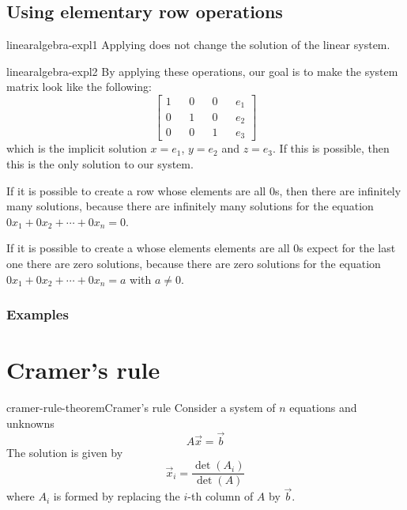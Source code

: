 \documentclass[preview]{standalone}
\begin{document}
\subsection{Using elementary row operations}

\begin{snippet}{linearalgebra-expl1}
    Applying 
    does not change the solution of the linear system.
\end{snippet}


\begin{snippet}{linearalgebra-expl2}
    By applying these operations, our goal is to make the system matrix
    look like the following:
    \[
        \begin{bmatrix} 
            1 && 0 && 0 && e_1 \\
            0 && 1 && 0 && e_2 \\
            0 && 0 && 1 && e_3
        \end{bmatrix}
    \]
    which is the implicit solution
    \(x=e_1\), \(y=e_2\) and \(z=e_3\).
    If this is possible, then this is the only solution to our system.

    \vspace{.25cm}

    If it is possible to create a row whose elements are all \(0\)s,
    then there are infinitely many solutions, because
    there are infinitely many solutions for the equation
    \(0x_1+0x_2+\cdots+0x_n = 0\).

    \vspace{.25cm}

    If it is possible to create a whose elements elements
    are all \(0\)s expect for the last one there are zero solutions,
    because there are zero solutions for the equation
    \(0x_1+0x_2+\cdots+0x_n = a\) with \(a \neq 0\).
\end{snippet}

\subsubsection{Examples}


\section{Cramer's rule}

\begin{snippettheorem}{cramer-rule-theorem}{Cramer's rule}
    Consider a system of \(n\) equations and unknowns
    \[
        A\vec{x}=\vec{b}
    \]
    The solution is given by
    \[
        \vec{x}_i = \frac{\det(A_i)}{\det(A)}
    \]
    where \(A_i\) is formed by replacing the \(i\)-th column
    of \(A\) by \(\vec{b}\).
\end{snippettheorem}
\end{document}

